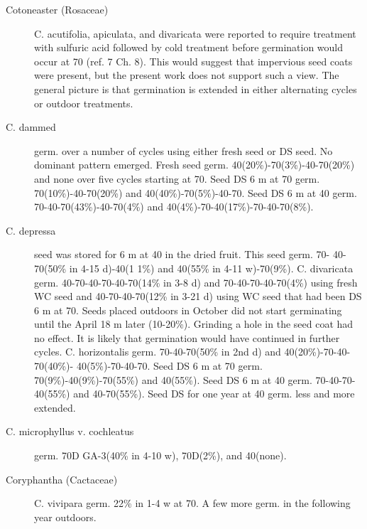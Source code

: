 \begin{description}
\item[Cotoneaster (Rosaceae)] C. acutifolia, apiculata, and divaricata were
reported to require treatment with sulfuric acid followed by cold treatment before
germination would occur at 70 (ref. 7 Ch. 8). This would suggest that impervious seed
coats were present, but the present work does not support such a view. The general
picture is that germination is extended in either alternating cycles or outdoor
treatments.
\item[C. dammed] germ. over a number of cycles using either fresh seed or DS seed.
No dominant pattern emerged. Fresh seed germ. 40(20\%)-70(3\%)-40-70(20\%) and
none over five cycles starting at 70. Seed DS 6 m at 70 germ. 70(10\%)-40-70(20\%)
and 40(40\%)-70(5\%)-40-70. Seed DS 6 m at 40 germ. 70-40-70(43\%)-40-70(4\%)
and 40(4\%)-70-40(17\%)-70-40-70(8\%).
\item[C. depressa] seed was stored for 6 m at 40 in the dried fruit. This seed germ. 70-
40-70(50\% in 4-15 d)-40(1 1\%) and 40(55\% in 4-11 w)-70(9\%).
C. divaricata germ. 40-70-40-70-40-70(14\% in 3-8 d) and 70-40-70-40-70(4\%)
using fresh WC seed and 40-70-40-70(12\% in 3-21 d) using WC seed that had been
DS 6 m at 70. Seeds placed outdoors in October did not start germinating until the
April 18 m later (10-20\%). Grinding a hole in the seed coat had no effect. It is likely
that germination would have continued in further cycles.
C. horizontalis germ. 70-40-70(50\% in 2nd d) and 40(20\%)-70-40-70(40\%)-
40(5\%)-70-40-70. Seed DS 6 m at 70 germ. 70(9\%)-40(9\%)-70(55\%) and 40(55\%).
Seed DS 6 m at 40 germ. 70-40-70-40(55\%) and 40-70(55\%). Seed DS for one year
at 40 germ. less and more extended.
\item[C. microphyllus v. cochleatus] germ. 70D GA-3(40\% in 4-10 w), 70D(2\%), and
40(none).

\item[Coryphantha (Cactaceae)] C. vivipara germ. 22\% in 1-4 w at 70. A few
more germ. in the following year outdoors.


\end{description}
